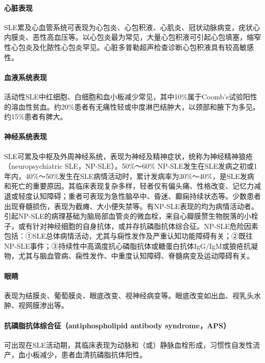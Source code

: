\paragraph{心脏表现}

SLE累及心血管系统可表现为心包炎、心包积液、心肌炎、冠状动脉病变，疣状心内膜炎、恶性高血压等。以心包炎最为常见，大量心包积液可引起心包填塞，缩窄性心包炎及化脓性心包炎罕见。心脏多普勒超声检查诊断心包积液具有较高敏感性。

\paragraph{血液系统表现}

活动性SLE中红细胞、白细胞和血小板减少常见，其中10\%属于Coomb's试验阳性的溶血性贫血。约20\%患者有无痛性轻或中度淋巴结肿大，以颈部和腋下为多见。约15\%患者有脾大。

\paragraph{神经系统表现}

SLE可累及中枢及外周神经系统，表现为神经及精神症状，统称为神经精神狼疮（neuropsychiatric
SLE，NP-SLE）。50\%～60\%
NP-SLE发生在SLE发病之初或1年内，40\%～50\%发生在SLE病情活动时，累计发病率为30\%～40\%，是SLE发病和死亡的重要原因。其临床表现复杂多样，轻者仅有偏头痛、性格改变、记忆力减退或轻度认知障碍；重者可表现为急性脑卒中、昏迷、癫痫持续状态等。少数患者出现脊髓损伤，表现为截瘫、大小便失禁等。有NP-SLE表现的均为病情活动者。引起NP-SLE的病理基础为脑局部血管炎的微血栓，来自心瓣膜赘生物脱落的小栓子，或有针对神经细胞的自身抗体，或并存抗磷脂抗体综合征。NP-SLE危险因素包括：①SLE总体病情活动，尤其与痫性发作及严重认知功能障碍有关；②既往NP-SLE事件；③持续性中高滴度抗心磷脂抗体或糖蛋白抗体IgG/IgM或狼疮抗凝物，尤其与脑血管病、痫性发作、中重度认知障碍、脊髓病变及运动障碍有关。

\paragraph{眼睛}

表现为结膜炎、葡萄膜炎、眼底改变、视神经病变等。眼底改变如出血、视乳头水肿、视网膜渗出等。

\paragraph{抗磷脂抗体综合征（antiphospholipid antibody syndrome，APS）}

可出现在SLE活动期，其临床表现为动脉和（或）静脉血栓形成，习惯性自发性流产，血小板减少，患者血清抗磷脂抗体阳性。

